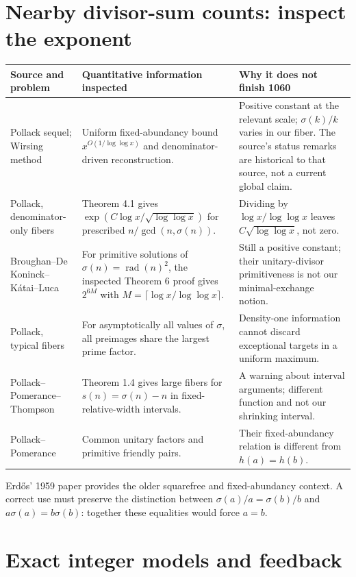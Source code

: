\section{Nearby divisor-sum counts: inspect the exponent}
\begin{longtable}{@{}p{}p{}p{}@{}}
\toprule Source and problem & Quantitative information inspected & Why it does not finish 1060\\\midrule\endhead
Pollack sequel; Wirsing method \cite{pollack2023} & Uniform fixed-abundancy bound $x^{O(1/\log\log x)}$ and denominator-driven reconstruction. & Positive constant at the relevant scale; $\sigma(k)/k$ varies in our fiber. The source's status remarks are historical to that source, not a current global claim.\\
Pollack, denominator-only fibers \cite{pollack2011} & Theorem 4.1 gives $\exp(C\log x/\sqrt{\log\log x})$ for prescribed $n/\gcd(n,\sigma(n))$. & Dividing by $\log x/\log\log x$ leaves $C\sqrt{\log\log x}$, not zero.\\
Broughan--De Koninck--K\'atai--Luca \cite{bdkl} & For primitive solutions of $\sigma(n)=\operatorname{rad}(n)^2$, the inspected Theorem 6 proof gives $2^{6M}$ with $M=\lceil\log x/\log\log x\rceil$. & Still a positive constant; their unitary-divisor primitiveness is not our minimal-exchange notion.\\
Pollack, typical fibers \cite{pollack2015} & For asymptotically all values of $\sigma$, all preimages share the largest prime factor. & Density-one information cannot discard exceptional targets in a uniform maximum.\\
Pollack--Pomerance--Thompson \cite{fibers} & Theorem 1.4 gives large fibers for $s(n)=\sigma(n)-n$ in fixed-relative-width intervals. & A warning about interval arguments; different function and not our shrinking interval.\\
Pollack--Pomerance \cite{pp} & Common unitary factors and primitive friendly pairs. & Their fixed-abundancy relation is different from $h(a)=h(b)$.\\
\bottomrule
\end{longtable}

Erd\H{o}s' 1959 paper \cite{erdos1959} provides the older squarefree and
fixed-abundancy context. A correct use must preserve the distinction between
$\sigma(a)/a=\sigma(b)/b$ and $a\sigma(a)=b\sigma(b)$: together these equalities
would force $a=b$.

\section{Exact integer models and feedback}

